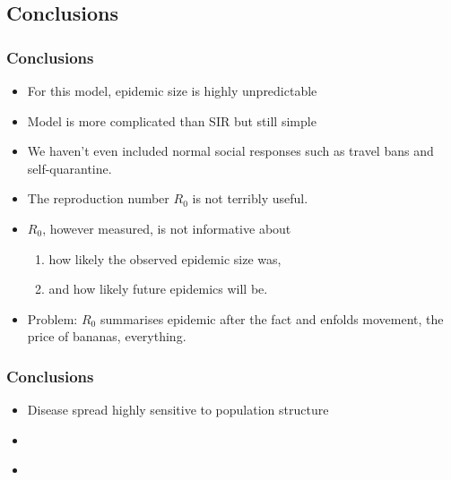 \subsection{Conclusions}

 \begin{frame}
   \frametitle{Conclusions}
   
   \begin{block}{}
     \begin{itemize}
     \item<1-> 
       For this model, epidemic size is highly unpredictable
     \item<2-> 
       Model is more complicated than SIR but still simple
     \item<3-> 
       We haven't even included normal social responses 
       such as travel bans and self-quarantine.
     \item<4-> 
       The reproduction number $R_0$ is not terribly useful.
     \item<5-> 
       $R_0$, however measured, is not informative
       about 
       \begin{enumerate}
       \item<6-> 
         how likely the observed epidemic size was,
       \item<7-> 
         and how likely future epidemics will be.
       \end{enumerate}
     \item<8-> 
       Problem: $R_0$ summarises  epidemic after the fact
       and enfolds movement, the price of bananas, everything.
     \end{itemize}
   \end{block}

 \end{frame}   
 
 \begin{frame}
   \frametitle{Conclusions}

   \begin{block}{}
     \begin{itemize}
     \item<1-> Disease spread highly sensitive to population structure
     \item<2-> \\
     \item<4-> \\
     \end{itemize}
   \end{block}
 
 \end{frame}

